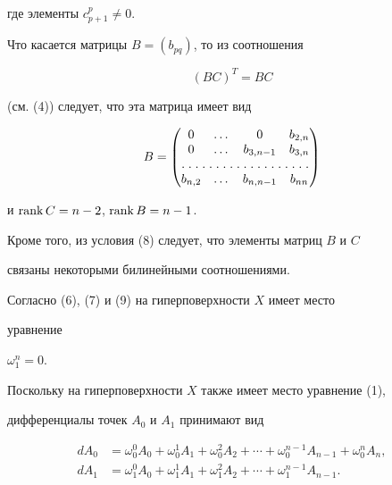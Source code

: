 где элементы $c_{p+1}^p \neq 0$.


Что касается матрицы  $B =(b_{pq})$, то из соотношения


\begin{equation}\label{eq:11}


(BC)^T = BC


\end{equation}


(см. (4)) следует, что эта матрица имеет вид


\begin{equation}\label{eq:12}


B =


\begin{pmatrix}


0 & \dotsc & 0 & b_{2,n}\\


0 & \dotsc & b_{3, n-1} & b_{3,n}\\


\hdotsfor[1.5]4  \\


b_{n,2} & \dotsc & b_{n,n-1} & b_{nn}


\end{pmatrix}


\end{equation}


и $\operatorname{rank} C = n - 2$, $\operatorname{rank} B = n - 1$.


Кроме того, из условия (8) следует, что элементы матриц $B$ и $C$


связаны некоторыми билинейными соотношениями.








Согласно (6), (7) и (9) на гиперповерхности $X$ имеет место


уравнение


$\omega_1^n = 0$.


Поскольку на гиперповерхности  $X$ также имеет место уравнение (1),


дифференциалы точек $A_0$ и $A_1$ принимают вид


\begin{equation}\label{eq:14}


\begin{split}


dA_0 &= \omega_0^0 A_0 + \omega_0^1 A_1 + \omega_0^2 A_2 +


\dotsb + \omega_0^{n-1} A_{n-1} + \omega_0^n A_n,\\


dA_1 &= \omega_1^0 A_0 + \omega_1^1 A_1 + \omega_1^2 A_2 +


\dotsb + \omega_1^{n-1} A_{n-1}.


\end{split}


\end{equation}



